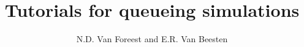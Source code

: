 \newenvironment{pynotangle}
    {\pyverbatim
    }
    {\endgraf\endpyverbatim
    }


\title{Tutorials for queueing simulations}
\author{N.D. Van Foreest and E.R. Van Beesten}


\maketitle

\tableofcontents

\clearpage


 \clearpage

\clearpage
{}\clearpage







